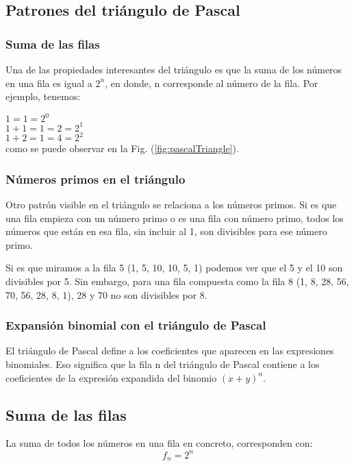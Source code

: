 \subsection{Patrones del triángulo de Pascal}

\subsubsection{Suma de las filas}

Una de las propiedades interesantes del triángulo es que la suma de los números
en una fila es igual a $2^n$, en donde, n corresponde al número de la fila. Por
ejemplo, tenemos:

$ 1 = 1 = 2^0 $ \\
$ 1 + 1 = 1 = 2 = 2^1 $ \\
$ 1 + 2 = 1 = 4 = 2^2 $\\

como se puede observar en la Fig. (\ref{fig:pascalTriangle}).

\subsubsection{Números primos en el triángulo}

Otro patrón visible en el triángulo se relaciona a los números primos. Si es que
una fila empieza con un número primo o es una fila con número primo, todos los
números que están en esa fila, sin incluir al 1, son divisibles para ese número
primo.

Si es que miramos a la fila 5 (1, 5, 10, 10, 5, 1) podemos ver que el 5 y el 10
son divisibles por 5. Sin embargo, para una fila compuesta como la fila 8 (1, 8,
28, 56, 70, 56, 28, 8, 1), 28 y 70 no son divisibles por 8.


\subsubsection{Expansión binomial con el triángulo de Pascal}

El triángulo de Pascal define a los coeficientes que aparecen en las expresiones
binomiales. Eso significa que la fila n del triángulo de Pascal contiene a los
coeficientes de la expresión expandida del binomio $(x+y)^n$.


\subsection*{Suma de las filas}
La suma de todos los n\'umeros en una fila en concreto, corresponden con:
		\begin{equation}
			f_n = 2^n
		\end{equation}

